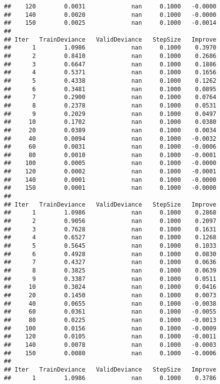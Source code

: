 \documentclass[
]{article}
\begin{document}
\begin{verbatim}
##    120        0.0031             nan     0.1000   -0.0000
##    140        0.0020             nan     0.1000   -0.0000
##    150        0.0025             nan     0.1000   -0.0014
## 
## Iter   TrainDeviance   ValidDeviance   StepSize   Improve
##      1        1.0986             nan     0.1000    0.3970
##      2        0.8410             nan     0.1000    0.2686
##      3        0.6647             nan     0.1000    0.1886
##      4        0.5371             nan     0.1000    0.1656
##      5        0.4338             nan     0.1000    0.1262
##      6        0.3481             nan     0.1000    0.0895
##      7        0.2900             nan     0.1000    0.0764
##      8        0.2378             nan     0.1000    0.0531
##      9        0.2029             nan     0.1000    0.0497
##     10        0.1702             nan     0.1000    0.0380
##     20        0.0389             nan     0.1000    0.0034
##     40        0.0094             nan     0.1000   -0.0032
##     60        0.0031             nan     0.1000   -0.0006
##     80        0.0010             nan     0.1000   -0.0001
##    100        0.0005             nan     0.1000   -0.0000
##    120        0.0002             nan     0.1000   -0.0001
##    140        0.0001             nan     0.1000   -0.0000
##    150        0.0001             nan     0.1000   -0.0000
## 
## Iter   TrainDeviance   ValidDeviance   StepSize   Improve
##      1        1.0986             nan     0.1000    0.2868
##      2        0.9056             nan     0.1000    0.2097
##      3        0.7628             nan     0.1000    0.1631
##      4        0.6527             nan     0.1000    0.1268
##      5        0.5645             nan     0.1000    0.1033
##      6        0.4928             nan     0.1000    0.0830
##      7        0.4327             nan     0.1000    0.0636
##      8        0.3825             nan     0.1000    0.0639
##      9        0.3387             nan     0.1000    0.0511
##     10        0.3024             nan     0.1000    0.0416
##     20        0.1450             nan     0.1000    0.0073
##     40        0.0655             nan     0.1000   -0.0038
##     60        0.0361             nan     0.1000   -0.0055
##     80        0.0225             nan     0.1000   -0.0013
##    100        0.0156             nan     0.1000   -0.0009
##    120        0.0105             nan     0.1000   -0.0011
##    140        0.0078             nan     0.1000   -0.0003
##    150        0.0080             nan     0.1000   -0.0006
## 
## Iter   TrainDeviance   ValidDeviance   StepSize   Improve
##      1        1.0986             nan     0.1000    0.3786

\end{verbatim}
\end{document}
